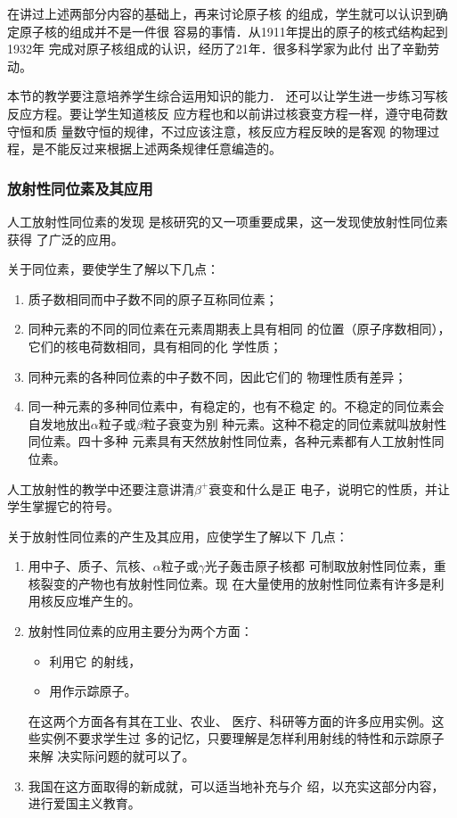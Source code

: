 在讲过上述两部分内容的基础上，再来讨论原子核
的组成，学生就可以认识到确定原子核的组成并不是一件很
容易的事情．从1911年提出的原子的核式结构起到1932年
完成对原子核组成的认识，经历了21年．很多科学家为此付
出了辛勤劳动。

本节的教学要注意培养学生综合运用知识的能力．
还可以让学生进一步练习写核反应方程。要让学生知道核反
应方程也和以前讲过核衰变方程一样，遵守电荷数守恒和质
量数守恒的规律，不过应该注意，核反应方程反映的是客观
的物理过程，是不能反过来根据上述两条规律任意编造的。

\subsubsection{放射性同位素及其应用}

人工放射性同位素的发现
是核研究的又一项重要成果，这一发现使放射性同位素获得
了广泛的应用。

关于同位素，要使学生了解以下几点：
\begin{enumerate}
\item 质子数相同而中子数不同的原子互称同位素；
\item 同种元素的不同的同位素在元素周期表上具有相同
的位置（原子序数相同），它们的核电荷数相同，具有相同的化
学性质；
\item 同种元素的各种同位素的中子数不同，因此它们的
物理性质有差异；
\item 同一种元素的多种同位素中，有稳定的，也有不稳定
的。不稳定的同位素会自发地放出$\alpha$粒子或$\beta$粒子衰变为别
种元素。这种不稳定的同位素就叫放射性同位素。四十多种
元素具有天然放射性同位素，各种元素都有人工放射性同
位素。
\end{enumerate}

人工放射性的教学中还要注意讲清$\beta^+$衰变和什么是正
电子，说明它的性质，并让学生掌握它的符号。

关于放射性同位素的产生及其应用，应使学生了解以下
几点：
\begin{enumerate}
\item 用中子、质子、氘核、$\alpha$粒子或$\gamma$光子轰击原子核都
可制取放射性同位素，重核裂变的产物也有放射性同位素。现
在大量使用的放射性同位素有许多是利用核反应堆产生的。

\item 放射性同位素的应用主要分为两个方面：
\begin{itemize}
\item 利用它
的射线，    \item 用作示踪原子。
\end{itemize}
在这两个方面各有其在工业、农业、
医疗、科研等方面的许多应用实例。这些实例不要求学生过
多的记忆，只要理解是怎样利用射线的特性和示踪原子来解
决实际问题的就可以了。
\item 
我国在这方面取得的新成就，可以适当地补充与介
绍，以充实这部分内容，进行爱国主义教育。
\end{enumerate}


